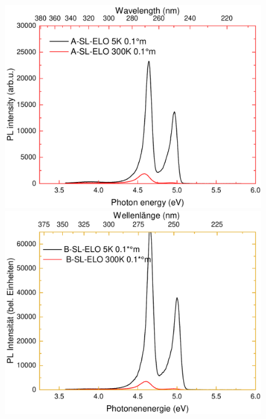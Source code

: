 \begin{figure}[htb]
  \centering
  \begin{minipage}[t]{0.4\textwidth}
    \centering
    \includegraphics[width=\textwidth]{Bilder/TS4048/aslelo.pdf}
  \end{minipage}
	\hfill
  \begin{minipage}[t]{0.4\textwidth}
    \centering
    \includegraphics[width=\linewidth]{Bilder/TS4048/bslelo.pdf}
  \end{minipage}
	\hfill
  \begin{minipage}[t]{0.4\textwidth}
    \centering

\end{minipage}
\end{figure}
